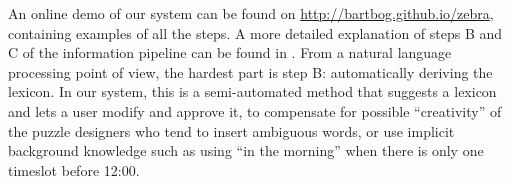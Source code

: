 \noindent
An online demo of our system can be found on \url{http://bartbog.github.io/zebra}, containing examples of all the steps. 
A more detailed explanation of steps B and C of the information pipeline can be found in \cite{msc/Claes17}. From a natural language processing point of view, the hardest part is step B: automatically deriving the lexicon. In our system, this is a semi-automated method that suggests a lexicon and lets a user modify and approve it, to compensate for possible ``creativity'' of the puzzle designers who tend to insert ambiguous words, or use implicit background knowledge such as using ``in the morning'' when there is only one timeslot before 12:00.